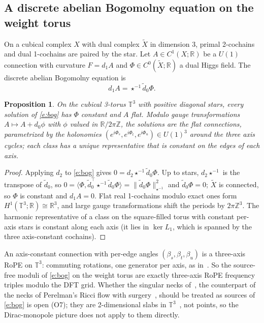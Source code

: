 \documentclass[10pt]{article}
\newtheorem{prop}[thm]{Proposition}
\theoremstyle{definition}
\newcommand{\R}{\mathbb R}\newcommand{\Z}{\mathbb Z}\newcommand{\C}{\mathbb C}
\newcommand{\Tor}{\mathbb T}\newcommand{\PT}{\mathbb{PT}}\newcommand{\CP}{\mathbb{CP}}
\begin{document}
\subsection{A discrete abelian Bogomolny equation on the weight torus}
On a cubical complex $X$ with dual complex $\tilde X$ in dimension 3, primal 2-cochains and dual 1-cochains are paired by the star. Let $A\in C^1(X;\R)$ be a $U(1)$ connection with curvature $F=d_1A$ and $\Phi\in C^0(\tilde X;\R)$ a dual Higgs field. The discrete abelian Bogomolny equation is
\begin{equation}\label{e:bog}
d_1A=\star^{-1}\tilde d_0\Phi .
\end{equation}

\begin{prop}\label{p:bog}
On the cubical 3-torus $\Tor^3$ with positive diagonal stars, every solution of \eqref{e:bog} has $\Phi$ constant and $A$ flat. Modulo gauge transformations $A\mapsto A+d_0\phi$ with $\phi$ valued in $\R/2\pi\Z$, the solutions are the flat connections, parametrized by the holonomies $(e^{i\Phi_s},e^{i\Phi_t},e^{i\Phi_u})\in U(1)^3$ around the three axis cycles; each class has a unique representative that is constant on the edges of each axis.
\end{prop}
\begin{proof}
Applying $d_2$ to \eqref{e:bog} gives $0=d_2\star^{-1}\tilde d_0\Phi$. Up to stars, $d_2\star^{-1}$ is the transpose of $\tilde d_0$, so $0=\langle\Phi,\tilde d_0^{\top}\star^{-1}\tilde d_0\Phi\rangle=\|\tilde d_0\Phi\|^2_{\star^{-1}}$ and $\tilde d_0\Phi=0$; $\tilde X$ is connected, so $\Phi$ is constant and $d_1A=0$. Flat real 1-cochains modulo exact ones form $H^1(\Tor^3;\R)\cong\R^3$, and large gauge transformations shift the periods by $2\pi\Z^3$. The harmonic representative of a class on the square-filled torus with constant per-axis stars is constant along each axis (it lies in $\ker L_1$, which is spanned by the three axis-constant cochains).
\end{proof}
\noindent An axis-constant connection with per-edge angles $(\beta_s,\beta_t,\beta_u)$ is a three-axis RoPE on $\Tor^3$: commuting rotations, one generator per axis, as in~\cite{liuzhou}. So the source-free moduli of \eqref{e:bog} on the weight torus are exactly three-axis RoPE frequency triples modulo the DFT grid. Whether the singular necks of~\cite{surg}, the counterpart of the necks of Perelman's Ricci flow with surgery~\cite{perelman1,perelman2,perelman3}, should be treated as sources of \eqref{e:bog} is open (O7); they are 2-dimensional slabs in $\Tor^3$~\cite{mono}, not points, so the Dirac-monopole picture does not apply to them directly.
\end{document}
